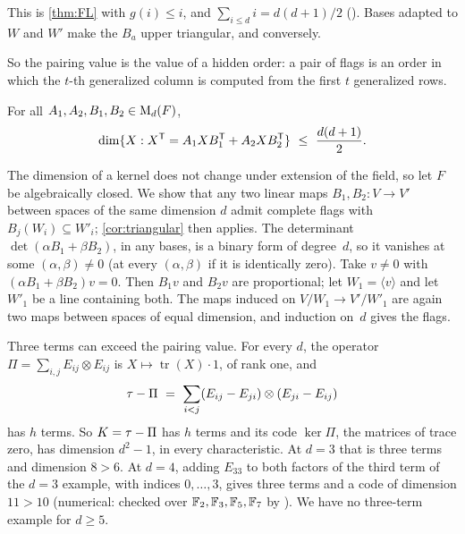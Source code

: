 \begin{outline}
This is \cref{thm:FL} with $g(i)\le i$, and $\sum_{i\le d}i=d(d+1)/2$ (). Bases adapted to
$W$ and $W'$ make the $B_a$ upper triangular, and conversely.
\end{outline}

So the pairing value is the value of a hidden order: a pair of flags is an order in which the $t$-th generalized column
is computed from the first $t$ generalized rows.

\begin{corollary}\label{cor:two-terms}
\notformalized
For all $A_1,A_2,B_1,B_2\in\mathrm{M}_d(F)$,
\[
  \dim\{X:X^{\tr}=A_1XB_1^{\tr}+A_2XB_2^{\tr}\}\ \le\ \frac{d(d+1)}2 .
\]
\end{corollary}

\begin{informalproof}
The dimension of a kernel does not change under extension of the field, so let $F$ be algebraically closed. We show
that any two linear maps $B_1,B_2\colon V\to V'$ between spaces of the same dimension $d$ admit complete flags with
$B_j(W_i)\subseteq W'_i$; \cref{cor:triangular} then applies. The determinant $\det(\alpha B_1+\beta B_2)$, in any bases,
is a binary form of degree~$d$, so it vanishes at some $(\alpha,\beta)\ne0$ (at every $(\alpha,\beta)$ if it is
identically zero). Take $v\ne0$ with $(\alpha B_1+\beta B_2)v=0$. Then $B_1v$ and $B_2v$ are proportional; let
$W_1=\langle v\rangle$ and let $W'_1$ be a line containing both. The maps induced on $V/W_1\to V'/W'_1$ are again two
maps between spaces of equal dimension, and induction on~$d$ gives the flags.
\end{informalproof}

\begin{remark}\label{rem:three}
Three terms can exceed the pairing value. For every $d$, the operator $\Pi=\sum_{i,j}E_{ij}\otimes E_{ij}$ is
$X\mapsto\operatorname{tr}(X)\cdot1$, of rank one, and
\[
  \sw-\Pi\ =\ \sum_{i<j}(E_{ij}-E_{ji})\otimes(E_{ji}-E_{ij})
\]
has $h$ terms. So $K=\tau-\Pi$ has $h$ terms and its code $\ker\Pi$, the matrices of trace zero, has dimension $d^2-1$,
in every characteristic. At $d=3$ that is three terms and dimension $8>6$. At $d=4$, adding $E_{33}$ to both factors
of the third term of the $d=3$ example, with indices $0,\dots,3$, gives three terms and a code of dimension $11>10$
(numerical: checked over $\mathbb{F}_2,\mathbb{F}_3,\mathbb{F}_5,\mathbb{F}_7$ by ). We have no three-term
example for $d\ge5$.
\end{remark}

